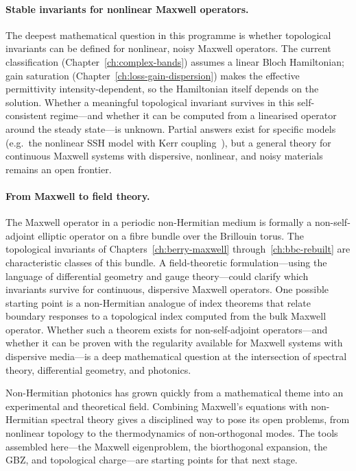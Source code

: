 \paragraph{Stable invariants for nonlinear Maxwell operators.}
The deepest mathematical question in this programme is whether
topological invariants can be defined for nonlinear, noisy Maxwell
operators. The current classification
(Chapter~\ref{ch:complex-bands}) assumes a linear Bloch Hamiltonian;
gain saturation (Chapter~\ref{ch:loss-gain-dispersion}) makes the
effective permittivity intensity-dependent, so the Hamiltonian itself
depends on the solution. Whether a meaningful topological invariant
survives in this self-consistent regime---and whether it can be computed
from a linearised operator around the steady state---is unknown.
Partial answers exist for specific models (e.g.\ the nonlinear SSH
model with Kerr coupling~\cite{hill2026exceptional}), but a general
theory for continuous Maxwell systems with dispersive, nonlinear,
and noisy materials remains an open frontier.

\paragraph{From Maxwell to field theory.}
The Maxwell operator in a periodic non-Hermitian medium is formally a
non-self-adjoint elliptic operator on a fibre bundle over the Brillouin
torus. The topological invariants of Chapters~\ref{ch:berry-maxwell}
through~\ref{ch:bbc-rebuilt} are characteristic classes of this bundle.
A field-theoretic formulation---using the language of differential
geometry and gauge theory---could clarify which invariants survive for
continuous, dispersive Maxwell operators. One possible starting point is
a non-Hermitian analogue of index theorems that relate boundary
responses to a topological index computed from the bulk Maxwell
operator.
Whether such a theorem exists for non-self-adjoint operators---and
whether it can be proven with the regularity available for Maxwell
systems with dispersive media---is a deep mathematical question at the
intersection of spectral theory, differential geometry, and photonics.

\begin{takeaway}
Non-Hermitian photonics has grown quickly from a mathematical theme into
an experimental and theoretical field. Combining Maxwell's equations with
non-Hermitian spectral theory gives a disciplined way to pose its open
problems, from nonlinear topology to the thermodynamics of
non-orthogonal modes. The tools assembled here---the Maxwell eigenproblem,
the biorthogonal expansion, the GBZ, and topological charge---are starting
points for that next stage.
\end{takeaway}
